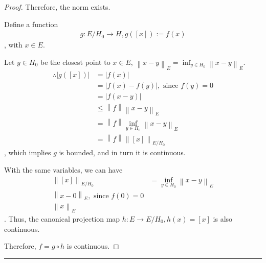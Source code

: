 \documentclass{article}
\newcommand{\norm}[1]{\left\|#1\right\|}
\newcommand{\abs}[1]{\left|#1\right|}
\begin{document}
\begin{proof}
Therefore, the norm exists.


Define a function
\begin{align}
    g: E / H_0 \to H, g([x]) := f(x)
\end{align}
, with $x \in E$.

Let $y \in H_0$ be the closest point to $x \in E$, $ \norm{x - y}_E = \inf_{y \in H_0} \norm{x - y}_E$.
\begin{align}
    \therefore \abs{g([x])} 
    &= \abs{f(x)}
    \\
    &= \abs{f(x) - f(y)},
    \text{ since } f(y) = 0
    \\
    &= \abs{f(x - y)}
    \\
    &\leq \norm{f} \norm{x -y}_E
    \\
    &= \norm{f} \inf_{y \in H_0} \norm{x - y}_E
    \\
    &= \norm{f} \norm{[x]}_{E / H_0}
\end{align}
, which implies $g$ is bounded, and in turn it is continuous.

With the same variables, we can have
\begin{align}
    \norm{[x]}_{E / H_0}
    &= \inf_{y \in H_0} \norm{x - y}_E
    \\
    \norm{x - 0}_E,
    \text{ since } f(0) = 0
    \\
    \norm{x}_E
\end{align}
. Thus, the canonical projection map $h: E \to E / H_0, h(x) = [x]$ is also continuous.

Therefore, $f = g \circ h$ is continuous.

\end{proof}

\hrule
\vspace{0.5em}

\end{document}
